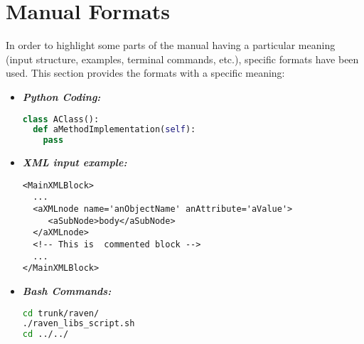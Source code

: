 \section{Manual Formats}
In order to highlight some parts of the manual having a particular meaning (input structure, examples, terminal commands, etc.), specific formats have been used. This section provides the formats with a specific meaning:
\begin{itemize}
\item \textbf{\textit{Python Coding:}}
\begin{lstlisting}[language=python]
class AClass():
  def aMethodImplementation(self):
    pass
\end{lstlisting}
\item \textbf{\textit{XML input example:}}
\begin{lstlisting}[style=XML,morekeywords={anAttribute}]
<MainXMLBlock>
  ...
  <aXMLnode name='anObjectName' anAttribute='aValue'>
     <aSubNode>body</aSubNode>
  </aXMLnode>
  <!-- This is  commented block -->
  ...
</MainXMLBlock>
\end{lstlisting}
\item \textbf{\textit{Bash Commands:}}
\begin{lstlisting}[language=bash]
cd trunk/raven/
./raven_libs_script.sh
cd ../../
\end{lstlisting}
\end{itemize}

